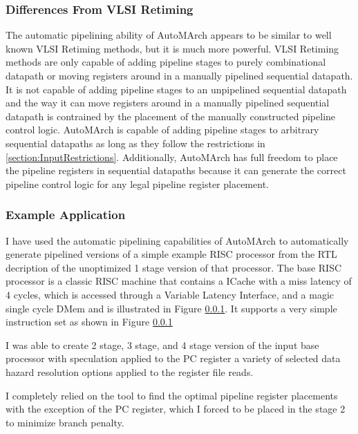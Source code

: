\subsubsection{Differences From VLSI Retiming}
The automatic pipelining ability of AutoMArch appears to be similar to well known VLSI Retiming methods, but it is much more powerful. VLSI Retiming methods are only capable of adding pipeline stages to purely combinational datapath or moving registers around in a manually pipelined sequential datapath. It is not capable of adding pipeline stages to an unpipelined sequential datapath and the way it can move registers around in a manually pipelined sequential datapath is contrained by the placement of the manually constructed pipeline control logic. AutoMArch is capable of adding pipeline stages to arbitrary sequential datapaths as long as they follow the restrictions in \ref{section:InputRestrictions}. Additionally, AutoMArch has full freedom to place the pipeline registers in sequential datapaths because it can generate the correct pipeline control logic for any legal pipeline register placement.

\subsubsection{Example Application}
\label{section:autoPipeEval}
I have used the automatic pipelining capabilities of AutoMArch to automatically generate pipelined versions of a simple example RISC processor from the RTL decription of the unoptimized 1 stage version of that processor. The base RISC processor is a classic RISC machine that contains a ICache with a miss latency of 4 cycles, which is accessed through a Variable Latency Interface, and a magic single cycle DMem and is illustrated in Figure \ref{}. It supports a very simple instruction set as shown in Figure \ref{}

I was able to create 2 stage, 3 stage, and 4 stage version of the input base processor with speculation applied to the PC register a variety of selected data hazard resolution options applied to the register file reads.

I completely relied on the tool to find the optimal pipeline register placements with the exception of the PC register, which I forced to be placed in the stage 2 to minimize branch penalty.


